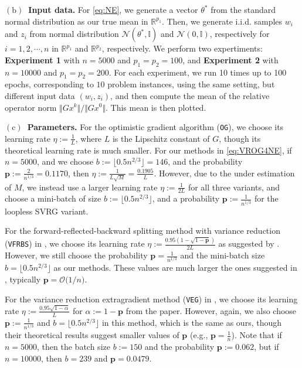 \documentclass{article}
\newcommand{\R}{\mathbb{R}}
\newcommand{\Id}{\mathbb{I}}
\newcommand{\norms}[1]{\Vert#1\Vert}
\newcommand{\Nc}{\mathcal{N}}
\newcommand{\BigOs}[1]{\mathcal{O}\big(#1\big)}
\newcommand{\mbf}[1]{\mathbf{#1}}
\theoremstyle{plain}
\theoremstyle{definition}
\theoremstyle{remark}
\begin{document}
\textbf{$\mathrm{(b)}$~Input data.}
For \eqref{eq:NE}, we generate a vector $\theta^{*}$ from the standard normal distribution as our true mean in $\R^{p_1}$.
Then, we generate i.i.d. samples $w_i$ and $z_i$ from normal distribution $\Nc(\theta^{*}, \Id)$ and $\Nc(0, \Id)$, respectively for $i=1,2,\cdots, n$ in $\R^{p_1}$ and $\R^{p_2}$, respectively.
We perform two expertiments: \textbf{Experiment 1} with $n=5000$ and $p_1 = p_2 = 100$, and \textbf{Experiment 2} with $n=10000$ and $p_1 = p_2 = 200$.
For each experiment, we run 10 times up to 100 epochs, corresponding to $10$ problem instances, using the same setting, but different input data $(w_i, z_i)$, and then compute the mean of the relative operator norm $\norms{Gx^k} / \norms{Gx^0}$.
This mean is then plotted.

\textbf{$\mathrm{(c)}$~Parameters.}
For the optimistic gradient algorithm (\texttt{OG}), we choose its learning rate $\eta := \frac{1}{L}$, where $L$ is the Lipschitz constant of $G$, though its theoretical learning rate is much smaller.
For our methods in \eqref{eq:VROG4NE}, if $n=5000$, and we choose $b := \lfloor 0.5 n^{2/3} \rfloor = 146$, and the probability $\mathbf{p} := \frac{2}{n^{1/3}} = 0.1170$, then $\eta := \frac{1}{L\sqrt{M}} =  \frac{0.1905}{ L}$.
However, due to the under estimation of $M$, we instead use a larger learning rate $\eta := \frac{1}{2L}$ for all three variants, and choose a mini-batch of size $b := \lfloor 0.5 n^{2/3} \rfloor$, and a probability $\mathbf{p} := \frac{1}{n^{1/3}}$ for the loopless SVRG variant.

For the forward-reflected-backward splitting method with variance reduction (\texttt{VFRBS}) in \citep{alacaoglu2022beyond}, we choose its learning rate $\eta := \frac{0.95(1 - \sqrt{1 - \mathbf{p}})}{2L}$ as suggested by \citep{alacaoglu2022beyond}.
However, we still choose the probability $\mbf{p} = \frac{1}{n^{1/3}}$ and the mini-batch size $b = \lfloor  0.5 n^{2/3}\rfloor$ as our methods.
These values are much larger the ones suggested in \citep{alacaoglu2022beyond}, typically $\mbf{p} = \BigOs{1/n}$.

For the variance reduction extragradient method (\texttt{VEG}) in \citep{alacaoglu2021stochastic}, we choose its learning rate $\eta := \frac{0.95\sqrt{1 - \alpha}}{L}$ for $\alpha := 1 - \mathbf{p}$ from the paper.
However, again, we also choose $\mathbf{p} :=  \frac{1}{n^{1/3}}$ and  $b = \lfloor  0.5 n^{2/3}\rfloor$ in this method, which is the same as ours, though their theoretical results suggest smaller values of $\mathbf{p}$ (e.g., $\mathbf{p} = \frac{1}{n}$).
Note that if $n = 5000$, then the batch size $b := 150$ and the probability $\mathbf{p} := 0.062$, but if $n=10000$, then $b = 239$ and $\mathbf{p} = 0.0479$. 
\end{document}
